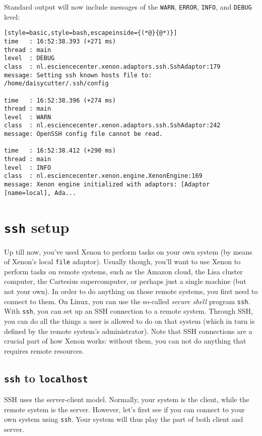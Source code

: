 Standard output will now include messages of the \texttt{WARN}, \texttt{ERROR}, \texttt{INFO}, and \texttt{DEBUG} level:
\begin{lstlisting}[style=basic,style=bash,escapeinside={(*@}{@*)}]
time   : 16:52:38.393 (+271 ms)
thread : main
level  : DEBUG
class  : nl.esciencecenter.xenon.adaptors.ssh.SshAdaptor:179
message: Setting ssh known hosts file to: /home/daisycutter/.ssh/config

time   : 16:52:38.396 (+274 ms)
thread : main
level  : WARN
class  : nl.esciencecenter.xenon.adaptors.ssh.SshAdaptor:242
message: OpenSSH config file cannot be read.

time   : 16:52:38.412 (+290 ms)
thread : main
level  : INFO
class  : nl.esciencecenter.xenon.engine.XenonEngine:169
message: Xenon engine initialized with adaptors: [Adaptor [name=local], Ada...
\end{lstlisting}




\section{\texttt{ssh} setup}

Up till now, you've used Xenon to perform tasks on your own system (by means of Xenon's local \texttt{file} adaptor). Usually though, you'll want to use Xenon to perform tasks on remote systems, such as the Amazon cloud, the Lisa cluster computer, the Cartesius supercomputer, or perhaps just a single machine (but not your own). In order to do anything on those remote systems, you first need to connect to them. On Linux, you can use the so-called \textit{secure shell} program \texttt{ssh}. With \texttt{ssh}, you can set up an SSH connection to a remote system. Through SSH, you can do all the things a user is allowed to do on that system (which in turn is defined by the remote system's administrator). Note that SSH connections are a crucial part of how Xenon works: without them, you can not do anything that requires remote resources.

\subsection{\texttt{ssh} to \texttt{localhost}}

SSH uses the server-client model. Normally, your system is the client, while the remote system is the server. However, let's first see if you can connect to your own system using \texttt{ssh}. Your system will thus play the part of both client and server.

